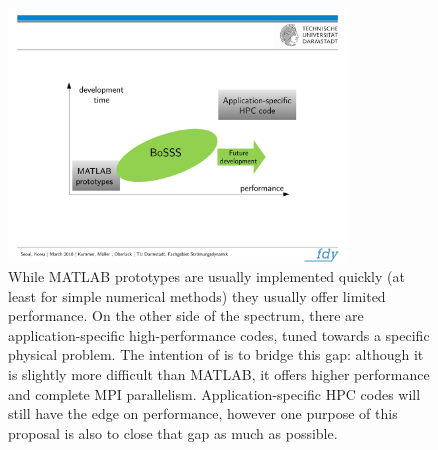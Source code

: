 \documentclass[a4paper,10pt]{report} %
\begin{document}
\begin{figure}[!h]
\begin{center}
\includegraphics[width=0.8\textwidth]{figures/BoSSS-philosophy-2}
\end{center}
\caption{
While MATLAB prototypes are usually implemented quickly (at least for simple numerical methods)
they usually offer limited performance.
On the other side of the spectrum, there are application-specific high-performance codes,
tuned towards a specific physical problem.
The intention of \BoSSS{} is to bridge this gap: although it is slightly more difficult
than MATLAB,
it offers higher performance and complete MPI parallelism.
Application-specific HPC codes will still have the edge on performance, however one purpose of this
proposal is also to close that gap as much as possible.
}
\label{fig:BoSSS-Philosophy-2}
\end{figure}
\end{document}
